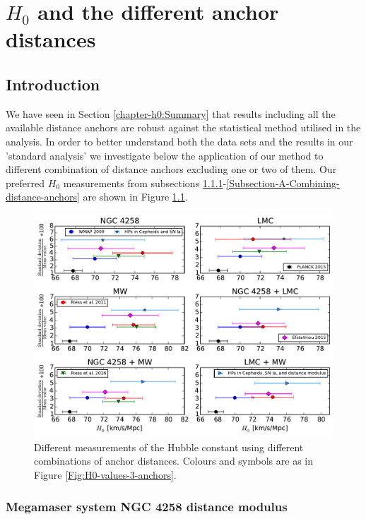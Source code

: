 \chapter{$H_0$ and the different anchor distances}
\label{appendix1-h0}

\section{Introduction}

We have seen in Section \ref{chapter-h0:Summary} that results including all the available distance anchors are robust against the statistical method utilised in the analysis. In order to better understand both the data sets and the results in our 'standard analysis' we investigate below the application of our method to different combination of distance anchors excluding one or two of them. Our preferred $H_0$ measurements from subsections \ref{Subsection:A-NGC4258}-\ref{Subsection-A-Combining-distance-anchors} are shown in Figure \ref{Fig:single-combined-anchor}. 

\begin{figure}[hbtp]
\centering
\includegraphics[scale=.8]{figures/chapter-h0/H0_values_anchor_combination.pdf}
\caption{Different measurements of the Hubble constant using different combinations of anchor distances. Colours and symbols are as in Figure \ref{Fig:H0-values-3-anchors}.}
\label{Fig:single-combined-anchor}
\end{figure}

\subsection{Megamaser system NGC 4258 distance modulus}
\label{Subsection:A-NGC4258}

